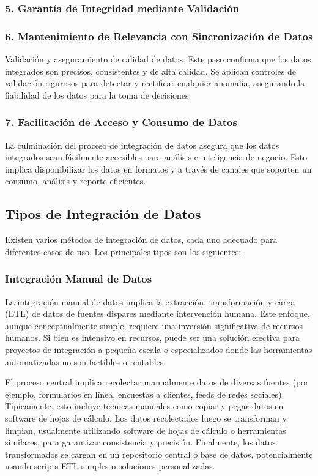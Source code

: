 \documentclass[12pt]{book}
\begin{document}
\subsubsection{5. Garantía de Integridad mediante Validación}
\subsubsection{6. Mantenimiento de Relevancia con Sincronización de Datos}
Validación y aseguramiento de calidad de datos. Este paso confirma que los datos integrados son precisos, consistentes y de alta calidad. Se aplican controles de validación rigurosos para detectar y rectificar cualquier anomalía, asegurando la fiabilidad de los datos para la toma de decisiones.
\subsubsection{7. Facilitación de Acceso y Consumo de Datos}
La culminación del proceso de integración de datos asegura que los datos integrados sean fácilmente accesibles para análisis e inteligencia de negocio. Esto implica disponibilizar los datos en formatos y a través de canales que soporten un consumo, análisis y reporte eficientes.

\subsection{Tipos de Integración de Datos}
Existen varios métodos de integración de datos, cada uno adecuado para diferentes casos de uso. Los principales tipos son los siguientes:

\subsubsection{Integración Manual de Datos}

La integración manual de datos implica la extracción, transformación y carga (ETL) de datos de fuentes dispares mediante intervención humana. Este enfoque, aunque conceptualmente simple, requiere una inversión significativa de recursos humanos. Si bien es intensivo en recursos, puede ser una solución efectiva para proyectos de integración a pequeña escala o especializados donde las herramientas automatizadas no son factibles o rentables.

El proceso central implica recolectar manualmente datos de diversas fuentes (por ejemplo, formularios en línea, encuestas a clientes, feeds de redes sociales). Típicamente, esto incluye técnicas manuales como copiar y pegar datos en software de hojas de cálculo. Los datos recolectados luego se transforman y limpian, usualmente utilizando software de hojas de cálculo o herramientas similares, para garantizar consistencia y precisión. Finalmente, los datos transformados se cargan en un repositorio central o base de datos, potencialmente usando scripts ETL simples o soluciones personalizadas.
\end{document}
